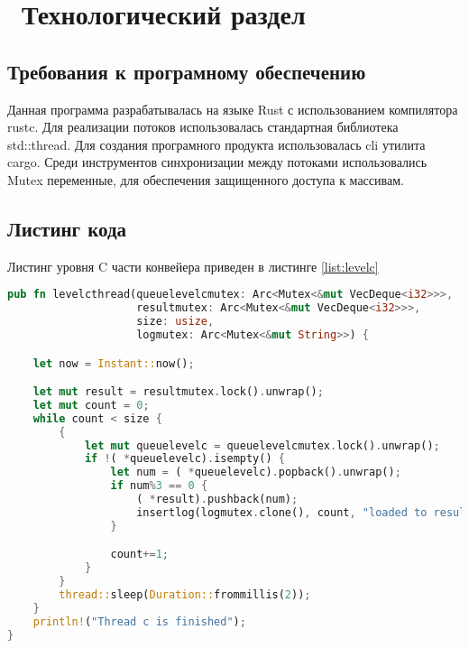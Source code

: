 \chapter{ Технологический раздел}
\section{ Требования к програмному обеспечению}
Данная программа разрабатывалась на языке Rust с использованием компилятора rustc. Для реализации потоков использовалась стандартная библиотека std::thread. Для создания програмного продукта использовалась cli утилита cargo. Среди инструментов синхронизации между потоками использовались Mutex переменные, для обеспечения защищенного доступа к массивам.

\section{ Листинг кода}

Листинг уровня C части конвейера приведен в листинге \ref{list:levelc}

\begin{lstlisting}[language=Rust, caption={ Реализация уровня C конвейера},
                    label={list:levelc}]
pub fn levelcthread(queuelevelcmutex: Arc<Mutex<&mut VecDeque<i32>>>, 
                    resultmutex: Arc<Mutex<&mut VecDeque<i32>>>,
                    size: usize,
                    logmutex: Arc<Mutex<&mut String>>) {

    let now = Instant::now();

    let mut result = resultmutex.lock().unwrap();
    let mut count = 0;
    while count < size {
        {
            let mut queuelevelc = queuelevelcmutex.lock().unwrap();
            if !( *queuelevelc).isempty() {
                let num = ( *queuelevelc).popback().unwrap();
                if num%3 == 0 {
                    ( *result).pushback(num);
                    insertlog(logmutex.clone(), count, "loaded to result", now.elapsed());
                }

                count+=1;
            }
        }
        thread::sleep(Duration::frommillis(2));
    }
    println!("Thread c is finished");
}

\end{lstlisting}
